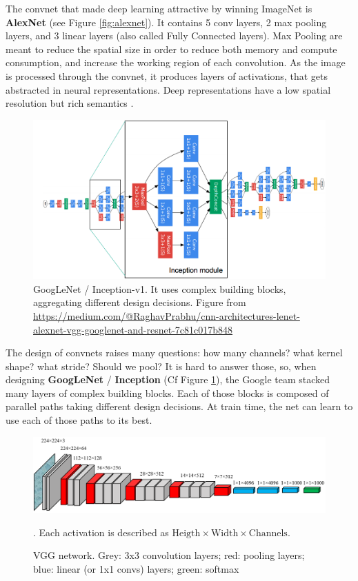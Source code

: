 The convnet that made deep learning attractive by winning ImageNet is \textbf{AlexNet} \citep{alexnet} (see Figure \ref{fig:alexnet}). It contains 5 conv layers, 2 max pooling layers, and 3 linear layers (also called Fully Connected layers). Max Pooling are meant to reduce the spatial size in order to reduce both memory and compute consumption, and increase the working region of each convolution. As the image is processed through the convnet, it produces layers of activations, that gets abstracted in neural representations. Deep representations have a low spatial resolution but rich semantics \citep{deepbelief,deepviz}.

\begin{figure}
    \centering
    \includegraphics[width=\columnwidth]{30-activity/googlenet.png}
    \caption{GoogLeNet / Inception-v1. It uses complex building blocks, aggregating different design decisions. Figure from \url{https://medium.com/@RaghavPrabhu/cnn-architectures-lenet-alexnet-vgg-googlenet-and-resnet-7c81c017b848}}
    \label{fig:googlenet}
\end{figure}

The design of convnets raises many questions: how many channels? what kernel shape? what stride? Should we pool? It is hard to answer those, so, when designing \textbf{GoogLeNet} / \textbf{Inception} \citep{googlenet} (Cf Figure \ref{fig:googlenet}), the Google team stacked many layers of complex building blocks. Each of those blocks is composed of parallel paths taking different design decisions. At train time, the net can learn to use each of those paths to its best.

\begin{figure}
    \centering
    \includegraphics[width=\columnwidth]{30-activity/VGG_neural_network.png}
    \caption{VGG network. Grey: 3x3 convolution layers; red: pooling layers; blue: linear (or 1x1 convs) layers; green: softmax}. Each activation is described as $\text{Heigth} \times \text{Width} \times \text{Channels}$.
    \label{fig:vgg}
\end{figure}

